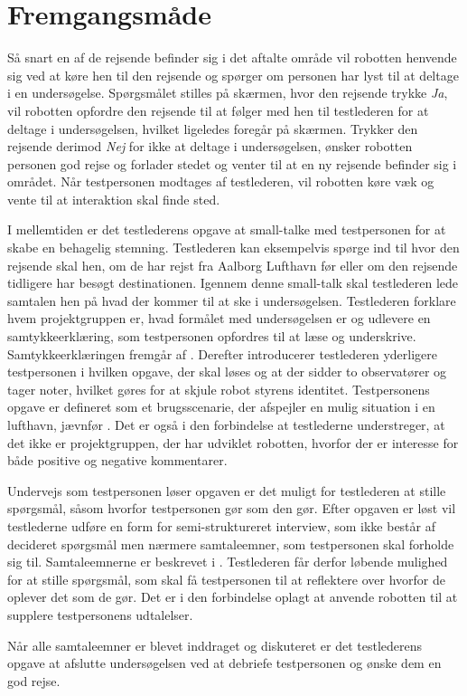 \section{Fremgangsmåde}
\label{ParametreFremgangsmaade}
%
Så snart en af de rejsende befinder sig i det aftalte område vil robotten henvende sig ved at køre hen til den rejsende og spørger om personen har lyst til at deltage i en undersøgelse. Spørgsmålet stilles på skærmen, hvor den rejsende trykke \textit{Ja}, vil robotten opfordre den rejsende til at følger med hen til testlederen for at deltage i undersøgelsen, hvilket ligeledes foregår på skærmen. Trykker den rejsende derimod \textit{Nej} for ikke at deltage i undersøgelsen, ønsker robotten personen god rejse og forlader stedet og venter til at en ny rejsende befinder sig i området. Når testpersonen modtages af testlederen, vil robotten køre væk og vente til at interaktion skal finde sted. 

I mellemtiden er det testlederens opgave at small-talke med testpersonen for at skabe en behagelig stemning. Testlederen kan eksempelvis spørge ind til hvor den rejsende skal hen, om de har rejst fra Aalborg Lufthavn før eller om den rejsende tidligere har besøgt destinationen. Igennem denne small-talk skal testlederen lede samtalen hen på hvad der kommer til at ske i undersøgelsen. Testlederen forklare hvem projektgruppen er, hvad formålet med undersøgelsen er og udlevere en samtykkeerklæring, som testpersonen opfordres til at læse og underskrive. Samtykkeerklæringen fremgår af . Derefter introducerer testlederen yderligere testpersonen i hvilken opgave, der skal løses og at der sidder to observatører og tager noter, hvilket gøres for at skjule robot styrens identitet. Testpersonens opgave er defineret som et brugsscenarie, der afspejler en mulig situation i en lufthavn, jævnfør . Det er også i den forbindelse at testlederne understreger, at det ikke er projektgruppen, der har udviklet robotten, hvorfor der er interesse for både positive og negative kommentarer. 

Undervejs som testpersonen løser opgaven er det muligt for testlederen at stille spørgsmål, såsom hvorfor testpersonen gør som den gør. Efter opgaven er løst vil testlederne udføre en form for semi-struktureret interview, som ikke består af decideret spørgsmål men nærmere samtaleemner, som testpersonen skal forholde sig til. Samtaleemnerne er beskrevet i . Testlederen får derfor løbende mulighed for at stille spørgsmål, som skal få testpersonen til at reflektere over hvorfor de oplever det som de gør. Det er i den forbindelse oplagt at anvende robotten til at supplere testpersonens udtalelser. 

Når alle samtaleemner er blevet inddraget og diskuteret er det testlederens opgave at afslutte undersøgelsen ved at debriefe testpersonen og ønske dem en god rejse.       



